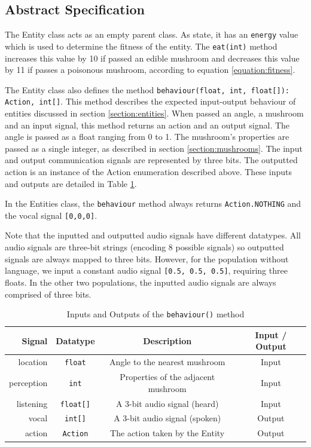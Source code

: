\documentclass[12pt,a4paper,twoside,openright]{report}
\begin{document}
\subsection{Abstract Specification}

The Entity class acts as an empty parent class. As state, it has an \texttt{energy} value which is used to determine the fitness of the entity. The \texttt{eat(int)} method increases this value by 10 if passed an edible mushroom and decreases this value by 11 if passes a poisonous mushroom, according to equation \ref{equation:fitness}. 

The Entity class also defines the method \texttt{behaviour(float, int, float[]): Action, int[]}. This method describes the expected input-output behaviour of entities discussed in section \ref{section:entities}. When passed an angle, a mushroom and an input signal, this method returns an action and an output signal. The angle is passed as a float ranging from 0 to 1. The mushroom's properties are passed as a single integer, as described in section \ref{section:mushrooms}. The input and output communication signals are represented by three bits. The outputted action is an instance of the Action enumeration described above. These inputs and outputs are detailed in Table \ref{table:behaviour}. 

In the Entities class, the \texttt{behaviour} method always returns \texttt{Action.NOTHING} and the vocal signal \texttt{[0,0,0]}.

Note that the inputted and outputted audio signals have different datatypes. All audio signals are three-bit strings (encoding 8 possible signals) so outputted signals are always mapped to three bits. However, for the population without language, we input a constant audio signal \texttt{[0.5, 0.5, 0.5]}, requiring three floats. In the other two populations, the inputted audio signals are always comprised of three bits.

\begin{table}[t]
\centering
 \begin{tabular}{ r | c | c | c}
 \bf{Signal} & \bf{Datatype} & \bf{Description} & \bf{Input / Output} \\ [0.5ex] 
 \hline
location & \texttt{float} & Angle to the nearest mushroom & Input \\
perception & \texttt{int} & Properties of the adjacent mushroom & Input \\
listening & \texttt{float[]} & A 3-bit audio signal (heard) & Input \\
vocal & \texttt{int[]} & A 3-bit audio signal (spoken) & Output \\
action & \texttt{Action} & The action taken by the Entity & Output \\
\end{tabular}
\caption{Inputs and Outputs of the \texttt{behaviour()} method}
\label{table:behaviour}
\end{table}
\end{document}
